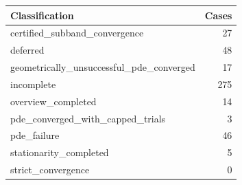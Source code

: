 \begin{tabular}{lr}
\toprule
Classification & Cases\\
\midrule
certified\_subband\_convergence & 27\\
deferred & 48\\
geometrically\_unsuccessful\_pde\_converged & 17\\
incomplete & 275\\
overview\_completed & 14\\
pde\_converged\_with\_capped\_trials & 3\\
pde\_failure & 46\\
stationarity\_completed & 5\\
strict\_convergence & 0\\
\bottomrule
\end{tabular}
